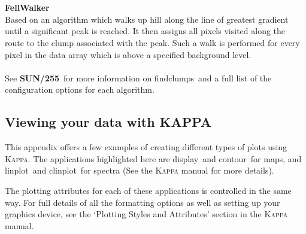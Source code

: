 \documentclass[twoside,11pt]{article}
\newcommand{\xref}[3]{#1}
\newcommand{\xlabel}[1]{}
\renewcommand{\_}{\texttt{\symbol{95}}}
\newcommand{\Kappa}{\xref{\textsc{Kappa}}{sun95}{}}
\newcommand{\task}[1]{\textsf{#1}}
\newcommand{\clinplot}{\xref{\task{clinplot}}{sun95}{CLINPLOT}}
\newcommand{\contour}{\xref{\task{contour}}{sun95}{CONTOUR}}
\newcommand{\display}{\xref{\task{display}}{sun95}{DISPLAY}}
\newcommand{\linplot}{\xref{\task{linplot}}{sun95}{LINPLOT}}
\newcommand{\findclumps}{\xref{\task{findclumps}}{sun255}{FINDCLUMPS}}
\newcommand{\cupidsun}{\xref{\textbf{SUN/255}}{sun255}{}}
\begin{document}
\\\\
\textbf{FellWalker}\\
Based on an algorithm which walks up hill along the line of greatest gradient until a significant peak is reached. It then assigns all pixels visited along the route to the clump associated with the peak. Such a walk is performed for every pixel in the data array which is above a specified background level.
\\\\
See \cupidsun\ for more information on \findclumps\ and a full list of the configuration options for each algorithm.


\newpage
\subsection{\xlabel{display}Viewing your data with KAPPA}
\label{app:display}
This appendix offers a few examples of creating different types of plots using \Kappa. The applications highlighted here are \display\ and \contour\ for maps, and \linplot\ and \clinplot\ for spectra (See the \xref{\textsc{Kappa} manual}{sun95}{} for more details).

 The plotting attributes for each of these applications is controlled in the same way.  For full details of all the formatting options as well as setting up your graphics device, see the `Plotting Styles and Attributes' section in the \xref{\textsc{Kappa} manual}{sun95}{}.
\end{document}
